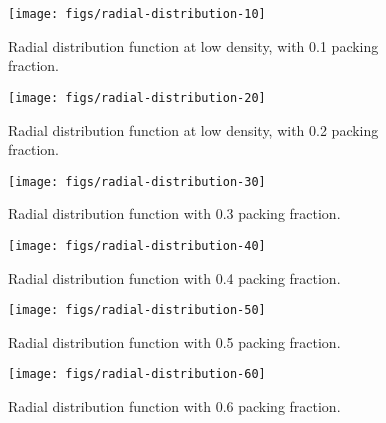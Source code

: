 \documentclass[letterpaper,twocolumn,amsmath,amssymb,prb]{revtex4-1}
\begin{document}
\begin{figure}
\begin{center}
\texttt{[image: figs/radial-distribution-10]}
\end{center}
\caption{Radial distribution function at low density, with 0.1 packing
  fraction.}
\label{fig:radial-distribution-10}
\end{figure}

\begin{figure}
\begin{center}
\texttt{[image: figs/radial-distribution-20]}
\end{center}
\caption{Radial distribution function at low density, with 0.2 packing
  fraction.}
\label{fig:radial-distribution-20}
\end{figure}

\begin{figure}
\begin{center}
\texttt{[image: figs/radial-distribution-30]}
\end{center}
\caption{Radial distribution function with 0.3 packing
  fraction.}
\label{fig:radial-distribution-30}
\end{figure}

\begin{figure}
\begin{center}
\texttt{[image: figs/radial-distribution-40]}
\end{center}
\caption{Radial distribution function with 0.4 packing
  fraction.}
\label{fig:radial-distribution-40}
\end{figure}

\begin{figure}
\begin{center}
\texttt{[image: figs/radial-distribution-50]}
\end{center}
\caption{Radial distribution function with 0.5 packing
  fraction.}
\label{fig:radial-distribution-50}
\end{figure}

\begin{figure}
\begin{center}
\texttt{[image: figs/radial-distribution-60]}
\end{center}
\caption{Radial distribution function with 0.6 packing
  fraction.}
\label{fig:radial-distribution-60}
\end{figure}

\end{document}
